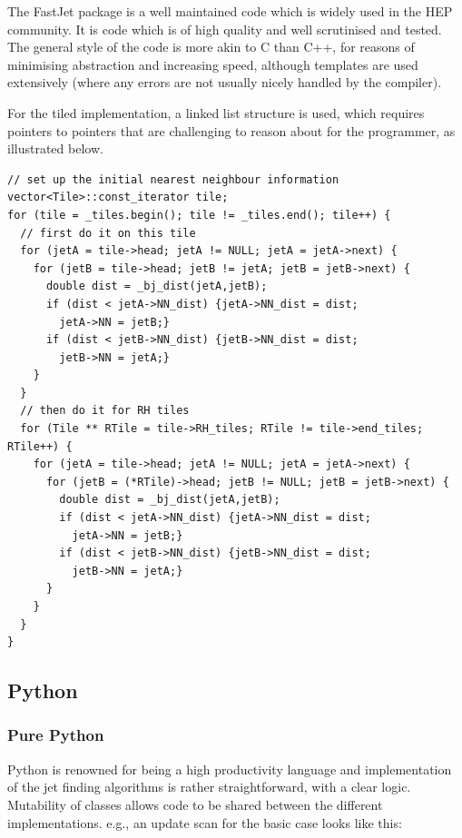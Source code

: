 \documentclass{webofc}
\begin{document}
The FastJet package is a well maintained code which is widely used in the HEP
community. It is code which is of high quality and well scrutinised and tested.
The general style of the code is more akin to C than C++, for reasons of
minimising abstraction and increasing speed, although templates are used
extensively (where any errors are not usually nicely handled by the compiler).

For the tiled implementation, a linked list structure is used, which requires
pointers to pointers that are challenging to reason about for the programmer, as
illustrated below.

\begin{verbatim}
// set up the initial nearest neighbour information
vector<Tile>::const_iterator tile;
for (tile = _tiles.begin(); tile != _tiles.end(); tile++) {
  // first do it on this tile
  for (jetA = tile->head; jetA != NULL; jetA = jetA->next) {
    for (jetB = tile->head; jetB != jetA; jetB = jetB->next) {
      double dist = _bj_dist(jetA,jetB);
      if (dist < jetA->NN_dist) {jetA->NN_dist = dist; 
        jetA->NN = jetB;}
      if (dist < jetB->NN_dist) {jetB->NN_dist = dist; 
        jetB->NN = jetA;}
    }
  }
  // then do it for RH tiles
  for (Tile ** RTile = tile->RH_tiles; RTile != tile->end_tiles; RTile++) {
    for (jetA = tile->head; jetA != NULL; jetA = jetA->next) {
      for (jetB = (*RTile)->head; jetB != NULL; jetB = jetB->next) {
        double dist = _bj_dist(jetA,jetB);
        if (dist < jetA->NN_dist) {jetA->NN_dist = dist; 
          jetA->NN = jetB;}
        if (dist < jetB->NN_dist) {jetB->NN_dist = dist; 
          jetB->NN = jetA;}
      }
    }
  }
}
\end{verbatim}

\subsection{Python}
\label{sec:python-ergonomics}

\subsubsection{Pure Python}

Python is renowned for being a high productivity language and implementation of
the jet finding algorithms is rather straightforward, with a clear logic.
Mutability of classes allows code to be shared between the different
implementations. e.g., an update scan for the basic case looks like this:
\end{document}
